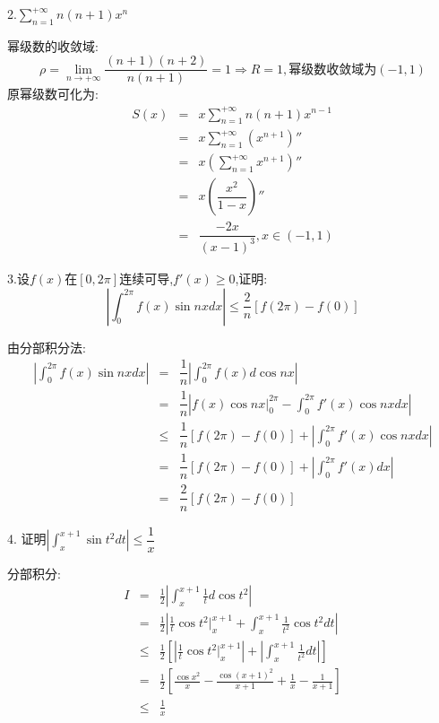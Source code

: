 
2.$\sum\limits_{n=1}^{+\infty}n(n+1)x^n$
\begin{solution}
	
	幂级数的收敛域: 
	$$\rho=\lim\limits_{n\rightarrow+\infty}\dfrac{(n+1)(n+2)}{n(n+1)}=1\Rightarrow R=1,\text{幂级数收敛域为}(-1,1)$$
	原幂级数可化为: 
	\begin{eqnarray*}
		S(x)&=&x\sum\limits_{n=1}^{+\infty}n(n+1)x^{n-1}\\&=&x\sum\limits_{n=1}^{+\infty}(x^{n+1})''\\&=&x\left( \sum\limits_{n=1}^{+\infty}x^{n+1}\right) ''\\
		&=&x\left( \dfrac{x^2}{1-x}\right) ''\\
		&=&\dfrac{-2x}{(x-1)^3},x\in(-1,1)
	\end{eqnarray*}
\end{solution}


3.设$f(x)$在$[0,2\pi]$连续可导,$f'(x)\geq 0$,证明: 
$$\left| \int_{0}^{2\pi}f(x)\sin nxdx\right|\leq \dfrac{2}{n}[f(2\pi)-f(0)] $$
\begin{solution}
	
	由分部积分法: 
	\begin{eqnarray*}
		\left| \int_{0}^{2\pi}f(x)\sin nxdx\right|&=&\dfrac{1}{n}\left| \int_{0}^{2\pi}f(x)d\cos nx\right|\\
		&=&\dfrac{1}{n}\left| f(x)\cos nx|_{0}^{2\pi}-\int_{0}^{2\pi}f'(x)\cos nxdx\right|\\
		&\leq &\dfrac{1}{n}[f(2\pi)-f(0)]+|\int_{0}^{2\pi}f'(x)\cos nxdx|\\
		&=&\dfrac{1}{n}[f(2\pi)-f(0)]+|\int_{0}^{2\pi}f'(x)dx|\\
		&=&\dfrac{2}{n}[f(2\pi)-f(0)]
	\end{eqnarray*}
\end{solution}


4. 证明$\left| \int_{x}^{x+1}\sin t^2dt\right| \leq \dfrac{1}{x}$
\begin{solution}
	
	分部积分: 
	\begin{eqnarray*}
		I&=&\frac{1}{2}\left| \int_{x}^{x+1}\frac{1}{t}d\cos t^2\right|\\
		&=&\frac{1}{2}\left| \frac{1}{t}\cos t^2|_{x}^{x+1}+ \int_{x}^{x+1}\frac{1}{t^2}\cos t^2dt\right|\\
		&\leq&\frac{1}{2}[\left| \frac{1}{t}\cos t^2|_{x}^{x+1}\right|+\left|  \int_{x}^{x+1}\frac{1}{t^2}dt\right|]\\
		&=&\frac{1}{2}[\frac{\cos x^2}{x}-\frac{\cos(x+1)^2}{x+1}+\frac{1}{x}-\frac{1}{x+1}]\\
		&\leq&\frac{1}{x}
	\end{eqnarray*}
\end{solution}

